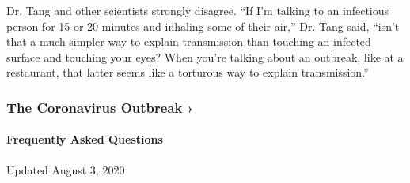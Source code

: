 Dr. Tang and other scientists strongly disagree. ``If I'm talking to an
infectious person for 15 or 20 minutes and inhaling some of their air,''
Dr. Tang said, ``isn't that a much simpler way to explain transmission
than touching an infected surface and touching your eyes? When you're
talking about an outbreak, like at a restaurant, that latter seems like
a torturous way to explain transmission.''

\href{https://www.nytimes.com/news-event/coronavirus?action=click\&pgtype=Article\&state=default\&region=MAIN_CONTENT_3\&context=storylines_faq}{}

\hypertarget{the-coronavirus-outbreak-}{%
\subsubsection{The Coronavirus Outbreak
›}\label{the-coronavirus-outbreak-}}

\hypertarget{frequently-asked-questions}{%
\paragraph{Frequently Asked
Questions}\label{frequently-asked-questions}}

Updated August 3, 2020

